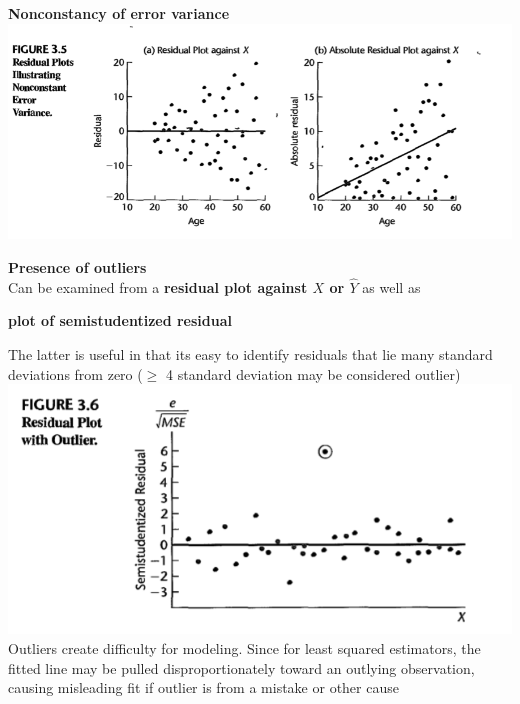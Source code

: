 \documentclass[11pt]{article}
\begin{document}
\begin{defn*}
    \textbf{Nonconstancy of error variance}\\
    \includegraphics[width=\textwidth]{err_var_plot.png}    
\end{defn*}

\begin{defn*}
    \textbf{Presence of outliers}\\
    Can be examined from a \textbf{residual plot against $X$ or $\hat{Y}$} as well as 
    \begin{center}
        \textbf{plot of semistudentized residual}
    \end{center}
    The latter is useful in that its easy to identify residuals that lie many standard deviations from zero ($\geq$ 4 standard deviation may be considered outlier) \\ 
    \includegraphics[width=\textwidth]{outlier_plot.png}    
    Outliers create difficulty for modeling. Since for least squared estimators, the fitted line may be pulled disproportionately toward an outlying observation, causing misleading fit if outlier is from a mistake or other cause
\end{defn*}
\end{document}
